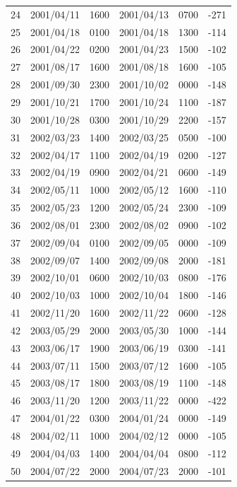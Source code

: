 \documentclass{article}
\begin{document}
\begin{table}[h]
\begin{tabular}{cccccc}
    24 & 2001/04/11 & 1600 & 2001/04/13 & 0700 & -271 \\
    25 & 2001/04/18 & 0100 & 2001/04/18 & 1300 & -114 \\
    26 & 2001/04/22 & 0200 & 2001/04/23 & 1500 & -102 \\
    27 & 2001/08/17 & 1600 & 2001/08/18 & 1600 & -105 \\
    28 & 2001/09/30 & 2300 & 2001/10/02 & 0000 & -148 \\
    29 & 2001/10/21 & 1700 & 2001/10/24 & 1100 & -187 \\
    30 & 2001/10/28 & 0300 & 2001/10/29 & 2200 & -157 \\
    31 & 2002/03/23 & 1400 & 2002/03/25 & 0500 & -100 \\
    32 & 2002/04/17 & 1100 & 2002/04/19 & 0200 & -127 \\
    33 & 2002/04/19 & 0900 & 2002/04/21 & 0600 & -149 \\
    34 & 2002/05/11 & 1000 & 2002/05/12 & 1600 & -110 \\
    35 & 2002/05/23 & 1200 & 2002/05/24 & 2300 & -109 \\
    36 & 2002/08/01 & 2300 & 2002/08/02 & 0900 & -102 \\
    37 & 2002/09/04 & 0100 & 2002/09/05 & 0000 & -109 \\
    38 & 2002/09/07 & 1400 & 2002/09/08 & 2000 & -181 \\
    39 & 2002/10/01 & 0600 & 2002/10/03 & 0800 & -176 \\
    40 & 2002/10/03 & 1000 & 2002/10/04 & 1800 & -146 \\
    41 & 2002/11/20 & 1600 & 2002/11/22 & 0600 & -128 \\
    42 & 2003/05/29 & 2000 & 2003/05/30 & 1000 & -144 \\
    43 & 2003/06/17 & 1900 & 2003/06/19 & 0300 & -141 \\
    44 & 2003/07/11 & 1500 & 2003/07/12 & 1600 & -105 \\
    45 & 2003/08/17 & 1800 & 2003/08/19 & 1100 & -148 \\
    46 & 2003/11/20 & 1200 & 2003/11/22 & 0000 & -422 \\
    47 & 2004/01/22 & 0300 & 2004/01/24 & 0000 & -149 \\
    48 & 2004/02/11 & 1000 & 2004/02/12 & 0000 & -105 \\
    49 & 2004/04/03 & 1400 & 2004/04/04 & 0800 & -112 \\
    50 & 2004/07/22 & 2000 & 2004/07/23 & 2000 & -101 \\

\end{tabular}
\end{table}
\end{document}
